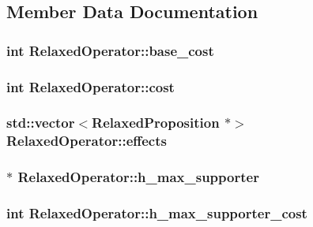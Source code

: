 \subsection{Member Data Documentation}
\hypertarget{structRelaxedOperator_a4c60fe17412b20e2083ebd5b0837fc15}{
\subsubsection[{base\-\_\-cost}]{\setlength{\rightskip}{0pt plus 5cm}int Relaxed\-Operator\-::base\-\_\-cost}}\label{structRelaxedOperator_a4c60fe17412b20e2083ebd5b0837fc15}
\hypertarget{structRelaxedOperator_a344c5c6d85fa1069d17759f6d3f8c0ae}{
\subsubsection[{cost}]{\setlength{\rightskip}{0pt plus 5cm}int Relaxed\-Operator\-::cost}}\label{structRelaxedOperator_a344c5c6d85fa1069d17759f6d3f8c0ae}
\hypertarget{structRelaxedOperator_acbe10020c12c3fe9fb8f3fac28ffa92a}{
\subsubsection[{effects}]{\setlength{\rightskip}{0pt plus 5cm}std\-::vector$<${\bf Relaxed\-Proposition} $\ast$$>$ Relaxed\-Operator\-::effects}}\label{structRelaxedOperator_acbe10020c12c3fe9fb8f3fac28ffa92a}
\hypertarget{structRelaxedOperator_a2c2aeea685741b096973775e90dc7fa4}{
\subsubsection[{h\-\_\-max\-\_\-supporter}]{$\ast$ Relaxed\-Operator\-::h\-\_\-max\-\_\-supporter}}\label{structRelaxedOperator_a2c2aeea685741b096973775e90dc7fa4}
\hypertarget{structRelaxedOperator_a9781b66e9598201074b1d6dc2118a96b}{
\subsubsection[{h\-\_\-max\-\_\-supporter\-\_\-cost}]{\setlength{\rightskip}{0pt plus 5cm}int Relaxed\-Operator\-::h\-\_\-max\-\_\-supporter\-\_\-cost}}\label{structRelaxedOperator_a9781b66e9598201074b1d6dc2118a96b}
